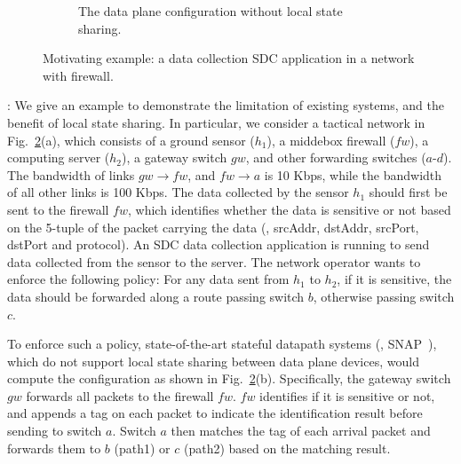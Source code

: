 \begin{figure}[!htbp]
\begin{subfigure}{0.8\linewidth}
      \caption{\label{fig:existing-result} \small The data plane configuration
	without local state sharing.}
\end{subfigure}
\caption{\small Motivating example: a data collection SDC application in a
	network with firewall.}
\label{fig:fw-example}
\end{figure}

: 
We give an example to demonstrate the limitation of existing systems, and the
benefit of local state sharing. In particular, we consider a tactical network in
Fig.~\ref{fig:fw-example}(a), which consists of a ground sensor ($h_1$), a
middebox firewall ($fw$), a computing server ($h_2$), a gateway switch $gw$, and
other forwarding switches ($a$-$d$). The bandwidth of links $gw\rightarrow fw$,
and $fw \rightarrow a$ is
10 Kbps, while the bandwidth of all other links is 100 Kbps. 
The data collected by the sensor $h_1$
should first be sent to the firewall $fw$, which identifies whether the data
is sensitive or not based on the 5-tuple of
the packet carrying the data (\ie, srcAddr, dstAddr, srcPort, dstPort and
protocol). An SDC data collection application is running to send data collected
from the sensor to the server. The network operator wants to enforce the following policy: For any
data sent from $h_1$ to $h_2$, if it is sensitive, the
data should be forwarded along a route passing switch $b$, otherwise passing switch $c$. 

To enforce such a policy, state-of-the-art stateful datapath systems (\eg,
SNAP~\cite{arashloo2016snap}), which do not support local state sharing between
data plane devices, would compute the configuration as shown in
Fig.~\ref{fig:fw-example}(b).  Specifically, the gateway switch $gw$ forwards
all packets to the firewall $fw$. $fw$ identifies if it is sensitive or not, and
appends a tag on each packet to indicate the identification result before
sending to switch $a$. Switch $a$ then matches the tag of each arrival packet
and forwards them to $b$ (path1) or $c$ (path2) based on the matching result.

